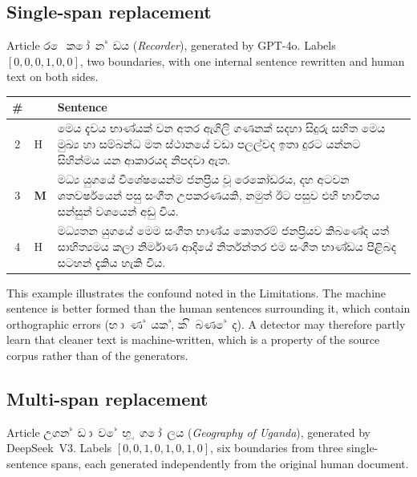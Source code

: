 \subsection{Single-span replacement}

Article \si{රෙකෝන්ඩය} (\emph{Recorder}), generated by GPT-4o. Labels
$[0,0,0,1,0,0]$, two boundaries, with one internal sentence rewritten and human
text on both sides.

\begin{table}[h]
\centering
\small
\begin{tabular}{@{}cl p{}@{}}
\toprule
\# & & Sentence \\
\midrule
2 & H & \si{මෙය දැවය භාණ්යක් වන අතර ඇගිලි ගණනක් සදහා සිදුරු සහිත මෙය මුඛ්‍ය හා සම්බන්ධ මත ස්ථානයේ වඩා පලල්වද ඉතා දුරට යන්නට සිහින්මය යන ආකාරයද නිපදවා ඇත.} \\[2pt]
3 & \textbf{M} & \si{මධ්‍ය යුගයේ විශේෂයෙන්ම ජනප්‍රිය වූ රෙකෝඩරය, දහ අටවන ශතවර්ෂයෙන් පසු සංගීත උපකරණයකි, නමුත් ඊට පසුව එහි භාවිතය සන්සුන් වශයෙන් අඩු විය.} \\[2pt]
4 & H & \si{මධ්‍යතන යුගයේ මෙම සංගීත භාණ්ය කොතරම් ජනප්‍රියව කිබණේද යත් සාහිත්‍යමය කලා නිර්මාණ ආදියේ නිර්තන්තර එම සංගීත භාණ්ඩය පිළිබද සටහන් දැකිය හැකි විය.} \\
\bottomrule
\end{tabular}
\end{table}

This example illustrates the confound noted in the Limitations. The machine
sentence is better formed than the human sentences surrounding it, which
contain orthographic errors (\si{භාණ්යක්}, \si{කිබණේද}). A detector may
therefore partly learn that cleaner text is machine-written, which is a
property of the source corpus rather than of the generators.

\subsection{Multi-span replacement}

Article \si{උගන්ඩාවේ භූගෝලය} (\emph{Geography of Uganda}), generated by
DeepSeek~V3. Labels $[0,0,1,0,1,0,1,0]$, six boundaries from three
single-sentence spans, each generated independently from the original human
document.

